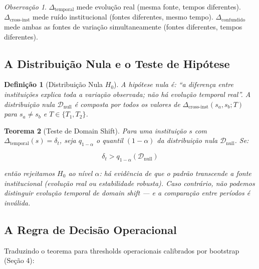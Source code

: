 \documentclass[12pt,a4paper]{article}
\newtheorem{defi}{Definição}[section]
\newtheorem{teo}[defi]{Teorema}
\theoremstyle{remark}
\newtheorem{obs}{Observação}[section]
\begin{document}
\begin{obs}
$\Delta_{\text{temporal}}$ mede evolução real (mesma fonte, tempos diferentes). $\Delta_{\text{cross-inst}}$ mede ruído institucional (fontes diferentes, mesmo tempo). $\Delta_{\text{confundido}}$ mede ambas as fontes de variação simultaneamente (fontes diferentes, tempos diferentes).
\end{obs}

\subsection{A Distribuição Nula e o Teste de Hipótese}

\begin{defi}[Distribuição Nula $H_0$]
A hipótese nula é: ``a diferença entre instituições explica toda a variação observada; não há evolução temporal real''. A distribuição nula $\mathcal{D}_{\text{null}}$ é composta por todos os valores de $\Delta_{\text{cross-inst}}(s_a, s_b; T)$ para $s_a \neq s_b$ e $T \in \{T_1, T_2\}$.
\end{defi}

\begin{teo}[Teste de Domain Shift]
Para uma instituição $s$ com $\Delta_{\text{temporal}}(s) = \delta_t$, seja $q_{1-\alpha}$ o quantil $(1-\alpha)$ da distribuição nula $\mathcal{D}_{\text{null}}$. Se:

\begin{equation}
\delta_t > q_{1-\alpha}(\mathcal{D}_{\text{null}})
\end{equation}

então rejeitamos $H_0$ ao nível $\alpha$: há evidência de que o padrão transcende a fonte institucional (evolução real ou estabilidade robusta). Caso contrário, não podemos distinguir evolução temporal de domain shift — e a comparação entre períodos é inválida.
\end{teo}

\subsection{A Regra de Decisão Operacional}

Traduzindo o teorema para thresholds operacionais calibrados por bootstrap (Seção 4):
\end{document}
